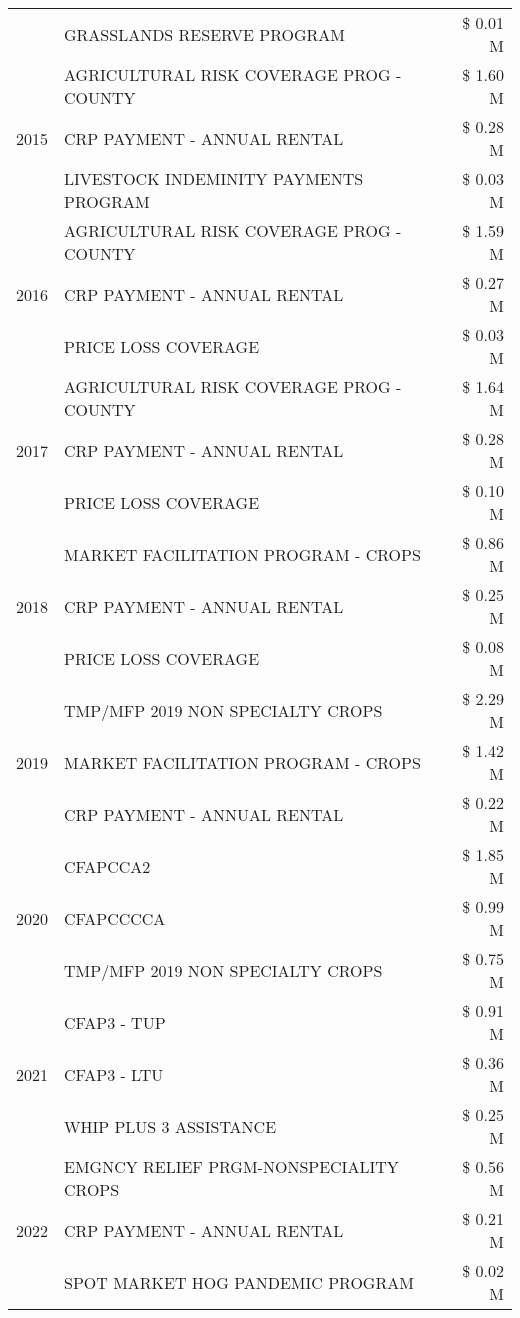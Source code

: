 \begin{tabular}{llr}
 & GRASSLANDS RESERVE PROGRAM & \$ 0.01 M \\
\cline{1-3}
\multirow[t]{3}{*}{2015} & AGRICULTURAL RISK COVERAGE PROG - COUNTY & \$ 1.60 M \\
 & CRP PAYMENT - ANNUAL RENTAL & \$ 0.28 M \\
 & LIVESTOCK INDEMINITY PAYMENTS PROGRAM & \$ 0.03 M \\
\cline{1-3}
\multirow[t]{3}{*}{2016} & AGRICULTURAL RISK COVERAGE PROG - COUNTY & \$ 1.59 M \\
 & CRP PAYMENT - ANNUAL RENTAL & \$ 0.27 M \\
 & PRICE LOSS COVERAGE & \$ 0.03 M \\
\cline{1-3}
\multirow[t]{3}{*}{2017} & AGRICULTURAL RISK COVERAGE PROG - COUNTY & \$ 1.64 M \\
 & CRP PAYMENT - ANNUAL RENTAL & \$ 0.28 M \\
 & PRICE LOSS COVERAGE & \$ 0.10 M \\
\cline{1-3}
\multirow[t]{3}{*}{2018} & MARKET FACILITATION PROGRAM - CROPS & \$ 0.86 M \\
 & CRP PAYMENT - ANNUAL RENTAL & \$ 0.25 M \\
 & PRICE LOSS COVERAGE & \$ 0.08 M \\
\cline{1-3}
\multirow[t]{3}{*}{2019} & TMP/MFP 2019 NON SPECIALTY CROPS & \$ 2.29 M \\
 & MARKET FACILITATION PROGRAM - CROPS & \$ 1.42 M \\
 & CRP PAYMENT - ANNUAL RENTAL & \$ 0.22 M \\
\cline{1-3}
\multirow[t]{3}{*}{2020} & CFAPCCA2 & \$ 1.85 M \\
 & CFAPCCCCA & \$ 0.99 M \\
 & TMP/MFP 2019 NON SPECIALTY CROPS & \$ 0.75 M \\
\cline{1-3}
\multirow[t]{3}{*}{2021} & CFAP3 - TUP & \$ 0.91 M \\
 & CFAP3 - LTU & \$ 0.36 M \\
 & WHIP PLUS 3 ASSISTANCE & \$ 0.25 M \\
\cline{1-3}
\multirow[t]{3}{*}{2022} & EMGNCY RELIEF PRGM-NONSPECIALITY CROPS & \$ 0.56 M \\
 & CRP PAYMENT - ANNUAL RENTAL & \$ 0.21 M \\
 & SPOT MARKET HOG PANDEMIC PROGRAM & \$ 0.02 M \\
\cline{1-3}
\bottomrule
\end{tabular}
